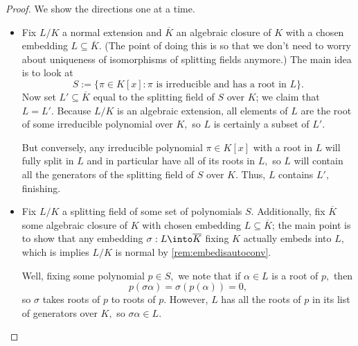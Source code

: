 \begin{proof}
	We show the directions one at a time.
	\begin{itemize}
		\item Fix $L/K$ a normal extension and $\overline K$ an algebraic closure of $K$ with a chosen embedding $L\subseteq\overline K.$ (The point of doing this is so that we don't need to worry about uniqueness of isomorphisms of splitting fields anymore.) The main idea is to look at
		\[S:=\{\pi\in K[x]:\pi\text{ is irreducible and has a root in }L\}.\]
		Now set $L'\subseteq\overline K$ equal to the splitting field of $S$ over $K$; we claim that $L=L'.$ Because $L/K$ is an algebraic extension, all elements of $L$ are the root of some irreducible polynomial over $K,$ so $L$ is certainly a subset of $L'.$

		But conversely, any irreducible polynomial $\pi\in K[x]$ with a root in $L$ will fully split in $L$ and in particular have all of its roots in $L,$ so $L$ will contain all the generators of the splitting field of $S$ over $K.$ Thus, $L$ contains $L',$ finishing.

		\item Fix $L/K$ a splitting field of some set of polynomials $S.$ Additionally, fix $\overline K$ some algebraic closure of $K$ with chosen embedding $L\subseteq\overline K$; the main point is to show that any embedding $\sigma:L\into\overline K$ fixing $K$ actually embeds into $L,$ which is implies $L/K$ is normal by \autoref{rem:embedisautoconv}.

		Well, fixing some polynomial $p\in S,$ we note that if $\alpha\in L$ is a root of $p,$ then
		\[p(\sigma\alpha)=\sigma(p(\alpha))=0,\]
		so $\sigma$ takes roots of $p$ to roots of $p.$ However, $L$ has all the roots of $p$ in its list of generators over $K,$ so $\sigma\alpha\in L.$


\end{itemize}
\end{proof}
